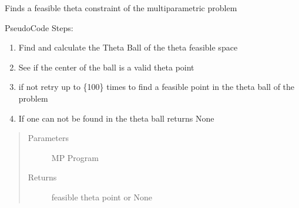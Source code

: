 \documentclass[letterpaper,10pt,english]{sphinxmanual}
\begin{document}
\begin{fulllineitems}
\label{\detokenize{mpo.utils:mpo.utils.mpqp_utils.get_feasible_theta_2}}
\sphinxAtStartPar
Finds a feasible theta constraint of the multi\sphinxhyphen{}parametric problem

\sphinxAtStartPar
Pseudo\sphinxhyphen{}Code Steps:
\begin{enumerate}
%
\item {} 
\sphinxAtStartPar
Find and calculate the Theta Ball of the theta feasible space

\item {} 
\sphinxAtStartPar
See if the center of the ball is a valid theta point

\item {} 
\sphinxAtStartPar
if not retry up to \{100\} times to find a feasible point in the theta ball of the problem

\item {} 
\sphinxAtStartPar
If one can not be found in the theta ball returns None

\end{enumerate}
\begin{quote}\begin{description}
\item[{Parameters}] \leavevmode
\sphinxAtStartPar
{} \textendash{} MP Program

\item[{Returns}] \leavevmode
\sphinxAtStartPar
feasible theta point or None

\end{description}\end{quote}

\end{fulllineitems}


\begin{fulllineitems}
\label{\detokenize{mpo.utils:mpo.utils.mpqp_utils.get_region}}
\end{fulllineitems}
\end{document}
